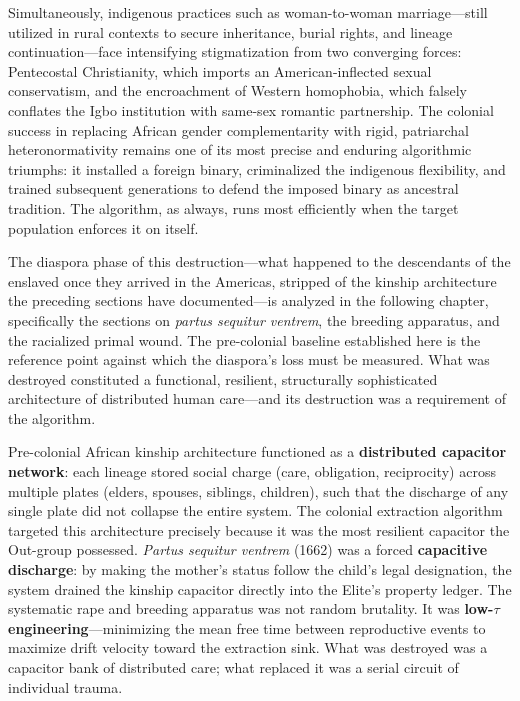Simultaneously, indigenous practices such as woman-to-woman marriage---still utilized in rural contexts to secure inheritance, burial rights, and lineage continuation---face intensifying stigmatization from two converging forces: Pentecostal Christianity, which imports an American-inflected sexual conservatism, and the encroachment of Western homophobia, which falsely conflates the Igbo institution with same-sex romantic partnership. The colonial success in replacing African gender complementarity with rigid, patriarchal heteronormativity remains one of its most precise and enduring algorithmic triumphs: it installed a foreign binary, criminalized the indigenous flexibility, and trained subsequent generations to defend the imposed binary as ancestral tradition. The algorithm, as always, runs most efficiently when the target population enforces it on itself.

The diaspora phase of this destruction---what happened to the descendants of the enslaved once they arrived in the Americas, stripped of the kinship architecture the preceding sections have documented---is analyzed in the following chapter, specifically the sections on \textit{partus sequitur ventrem}, the breeding apparatus, and the racialized primal wound. The pre-colonial baseline established here is the reference point against which the diaspora's loss must be measured. What was destroyed constituted a functional, resilient, structurally sophisticated architecture of distributed human care---and its destruction was a requirement of the algorithm.

\begin{keyinsight}
Pre-colonial African kinship architecture functioned as a \textbf{distributed capacitor network}: each lineage stored social charge (care, obligation, reciprocity) across multiple plates (elders, spouses, siblings, children), such that the discharge of any single plate did not collapse the entire system. The colonial extraction algorithm targeted this architecture precisely because it was the most resilient capacitor the Out-group possessed. \textit{Partus sequitur ventrem} (1662) was a forced \textbf{capacitive discharge}: by making the mother's status follow the child's legal designation, the system drained the kinship capacitor directly into the Elite's property ledger. The systematic rape and breeding apparatus was not random brutality. It was \textbf{low-$\tau$ engineering}---minimizing the mean free time between reproductive events to maximize drift velocity toward the extraction sink. What was destroyed was a capacitor bank of distributed care; what replaced it was a serial circuit of individual trauma.
\end{keyinsight}

